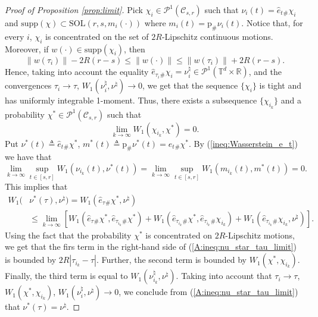 \documentclass[a4paper,12pt]{article}
\newcommand{\tdr}{\mathbb{T}^{d}\times\mathbb{R}}
\begin{document}
\begin{proof}[Proof of Proposition \ref{prop:limit}]
	Pick $\chi_i\in\mathcal{P}^1(\mathcal{C}_{s,r})$ such that $\nu_i(t)=\hat{e}_t{}_\#\chi_i$ and $\mathrm{supp}(\chi)\subset \mathrm{SOL}(r,s,m_i(\cdot))$ where $m_i(t)=\mathrm{p}_\#\nu_i(t)$. Notice  that, for every $i$, $\chi_i$ is concentrated on the set of $2R$-Lipschitz continuous motions. Moreover, if $w(\cdot)\in \mathrm{supp}(\chi_i)$, then
	\begin{equation*}\label{A:ineq:norm}
	\|w(\tau_i)\|-2R(r-s)\leq \|w(\cdot)\|\leq \|w(\tau_i)\|+2R(r-s).
	\end{equation*} Hence, taking into account the equality $\hat{e}_{\tau_i}{}_\#\chi_i=\nu_i^\natural\in\mathcal{P}^1(\tdr)$, and the convergences $\tau_i\rightarrow\tau$, $W_1(\nu_i^\natural,\nu^\natural)\rightarrow 0$, we get that the sequence $\{\chi_i\}$ is tight and has uniformly integrable 1-moment. Thus, there exists a subsequence $\{\chi_{i_k}\}$ and a probability $\chi^*\in\mathcal{P}^1(\mathcal{C}_{s,r})$ such that
	$$\lim_{k\rightarrow\infty} W_1(\chi_{i_k},\chi^*)=0. $$ Put
	$\nu^*(t)\triangleq \hat{e}_t{}_\#\chi^*$, $m^*(t)\triangleq \mathrm{p}_\#\nu^*(t)=e_t{}_\#\chi^*$. By (\ref{ineq:Wasserstein_e_t}) we have that
	$$\lim_{k\rightarrow\infty}\sup_{t\in [s,r]}W_1(\nu_{i_k}(t),\nu^*(t))=\lim_{k\rightarrow\infty}\sup_{t\in [s,r]}W_1(m_{i_k}(t),m^*(t))= 0.$$ 
	This implies that \begin{equation}\label{A:ineq:nu_star_tau_limit}
	\begin{split}
	W_1(&\nu^*(\tau),\nu^\natural)=W_1(\hat{e}_\tau{}_\#\chi^*,\nu^\natural)\\
	&\leq \lim_{k\rightarrow \infty} [W_1(\hat{e}_{\tau}{}_\#\chi^*,\hat{e}_{\tau_{i_k}}{}_\#\chi^*)
	+W_1(\hat{e}_{\tau_{i_k}}{}_\#\chi^*,\hat{e}_{\tau_{i_k}}{}_\#\chi_{i_k})+ W_1(\hat{e}_{\tau_{i_k}}{}_\#\chi_{i_k},\nu^\natural)]. \end{split}
	\end{equation} Using the fact that the probability $\chi^*$ is concentrated on $2R$-Lipschitz motions, we get that the firs term in the right-hand side of (\ref{A:ineq:nu_star_tau_limit})  is bounded by $2R|\tau_{i_k}-\tau|$. Further, the second term is bounded by $W_1(\chi^*,\chi_{i_k})$. Finally, the third term is equal to $W_1(\nu_{i_k}^\natural,\nu^\natural)$. Taking into account that $\tau_i\rightarrow\tau$, $W_1(\chi^*,\chi_{i_k})$, $W_1(\nu_i^\natural,\nu^\natural)\rightarrow 0$, we conclude from (\ref{A:ineq:nu_star_tau_limit}) that $\nu^*(\tau)=\nu^\natural$.  
	

\end{proof}
\end{document}
